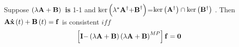 \begin{theorem}
\begin{corollary}
\begin{theorem}
Suppose $\left( \lambda {\bf A+B}\right) {\bf \ }${\bf is }1-1 and $\ker
\left( \lambda ^{\ast }{\bf A}^{\dagger }{\bf +B}^{\dagger }\right) $=$\ker
\left( {\bf A}^{\dagger }\right) \cap \ker \left( {\bf B}^{\dagger }\right) $%
. Then ${\bf A\dot{x}}\left( t\right) +{\bf B}\left( t\right) ={\bf f}$ is
consistent $iff$ 
\begin{equation}
\left[ {\bf I-}\left( \lambda {\bf A+B}\right) \left( \lambda {\bf A+B}%
\right) ^{MP}\right] {\bf f=0}
\end{equation}
\end{theorem}
\end{corollary}
\end{theorem}
